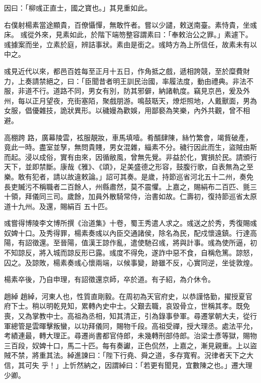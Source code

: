\begin{pinyinscope}
 因曰：「柳彧正直士，國之寶也。」其見重如此。



 右僕射楊素當途顯貴，百僚懾憚，無敢忤者。嘗以少譴，敕送南臺。素恃貴，坐彧床。
 彧從外來，見素如此，於階下端笏整容謂素曰：「奉敕治公之罪。」素遽下。彧據案而坐，立素於庭，辨詰事狀。素由是銜之。彧時方為上所信任，故素未有以中之。



 彧見近代以來，都邑百姓每至正月十五日，作角抵之戲，遞相誇競，至於糜費財力，上奏請禁絕之，曰：「臣聞昔者明王訓民治國，率履法度，動由禮典。非法不服，非道不行。道路不同，男女有別，防其邪僻，納諸軌度。竊見京邑，爰及外州，每以正月望夜，充街塞陌，聚戲朋游。鳴鼓聒天，燎炬照地，人戴獸面，男為女服，倡優雜技，詭狀異形。以穢嫚為歡娛，用鄙褻為笑樂，內外共觀，曾不相避。



 高棚跨
 路，廣幕陵雲，袨服靚妝，車馬填噎。肴醑肆陳，絲竹繁會，竭貲破產，竟此一時。盡室並孥，無問貴賤，男女混雜，緇素不分。穢行因此而生，盜賊由斯而起。浸以成俗，實有由來，因循敝風，曾無先覺。非益於化，實損於民。請頒行天下，並即禁斷。康哉《雅》、《頌》，足美盛德之形容，鼓腹行歌，自表無為之至樂。敢有犯者，請以故違敕論。」詔可其奏。是歲，持節巡省河北五十二州，奏免長吏贓污不稱職者二百餘人，州縣肅然，莫不震懼。上嘉之，賜絹布二百匹、氈三十領，拜儀同三司。歲餘，加員外散騎常侍，治書如故。仁壽初，復持節巡省太原道十九州。及還，賜絹百
 五十匹。



 彧嘗得博陵李文博所撰《治道集》十卷，蜀王秀遣人求之。彧送之於秀，秀復賜彧奴婢十口。及秀得罪，楊素奏彧以內臣交通諸侯，除名為民，配戍懷遠鎮。行達高陽，有詔徵還。至晉陽，值漢王諒作亂，遣使馳召彧，將與計事。彧為使所逼，初不知諒反，將入城而諒反形已露。彧度不得免，遂詐中惡不食，自稱危篤。諒怒，囚之。及諒敗，楊素奏彧心懷兩端，以候事變，跡雖不反，心實同逆，坐徙敦煌。



 楊素卒後，乃自申理，有詔徵還京師，卒於道。有子紹，為介休令。



 趙綽
 趙綽，河東人也，性質直剛毅。在周初為天官府史，以恭謹恪勤，擢授夏官府下士。稍以明乾見知，累轉內史中士。父艱去職，哀毀骨立，世稱其孝。既免喪，又為掌教中士。高祖為丞相，知其清正，引為錄事參軍。尋遷掌朝大夫，從行軍總管是雲暉擊叛蠻，以功拜儀同，賜物千段。高祖受禪，授大理丞。處法平允，考績連最，轉大理正。尋遷尚書都官侍郎，未幾轉刑部侍郎。治梁士彥等獄，賜物三百段，奴婢十口，馬二十匹。每有奏讞，正色侃然，上嘉之，漸見親重。上以盜賊不禁，將重其法。綽進諫曰：「陛下行堯、舜之道，多存寬宥。況律者天下之大信，其可失
 乎！」上忻然納之，因謂綽曰：「若更有聞見，宜數陳之也。」遷大理少卿。




\end{pinyinscope}
